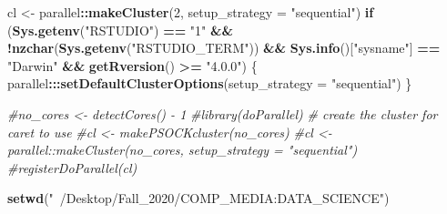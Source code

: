 \documentclass[
]{article}
\newenvironment{Shaded}{\begin{snugshade}}{\end{snugshade}}
\newcommand{\CommentTok}[1]{\textcolor[rgb]{0.56,0.35,0.01}{\textit{#1}}}
\newcommand{\ControlFlowTok}[1]{\textcolor[rgb]{0.13,0.29,0.53}{\textbf{#1}}}
\newcommand{\DataTypeTok}[1]{\textcolor[rgb]{0.13,0.29,0.53}{#1}}
\newcommand{\DecValTok}[1]{\textcolor[rgb]{0.00,0.00,0.81}{#1}}
\newcommand{\KeywordTok}[1]{\textcolor[rgb]{0.13,0.29,0.53}{\textbf{#1}}}
\newcommand{\NormalTok}[1]{#1}
\newcommand{\OperatorTok}[1]{\textcolor[rgb]{0.81,0.36,0.00}{\textbf{#1}}}
\newcommand{\StringTok}[1]{\textcolor[rgb]{0.31,0.60,0.02}{#1}}
\begin{document}
\begin{Shaded}
\begin{Highlighting}[]
\NormalTok{cl <-}\StringTok{ }\NormalTok{parallel}\OperatorTok{::}\KeywordTok{makeCluster}\NormalTok{(}\DecValTok{2}\NormalTok{, }\DataTypeTok{setup_strategy =} \StringTok{"sequential"}\NormalTok{)}
\ControlFlowTok{if}\NormalTok{ (}\KeywordTok{Sys.getenv}\NormalTok{(}\StringTok{"RSTUDIO"}\NormalTok{) }\OperatorTok{==}\StringTok{ "1"} \OperatorTok{&&}\StringTok{ }\OperatorTok{!}\KeywordTok{nzchar}\NormalTok{(}\KeywordTok{Sys.getenv}\NormalTok{(}\StringTok{"RSTUDIO_TERM"}\NormalTok{)) }\OperatorTok{&&}\StringTok{ }
\StringTok{    }\KeywordTok{Sys.info}\NormalTok{()[}\StringTok{"sysname"}\NormalTok{] }\OperatorTok{==}\StringTok{ "Darwin"} \OperatorTok{&&}\StringTok{ }\KeywordTok{getRversion}\NormalTok{() }\OperatorTok{>=}\StringTok{ "4.0.0"}\NormalTok{) \{}
\NormalTok{  parallel}\OperatorTok{:::}\KeywordTok{setDefaultClusterOptions}\NormalTok{(}\DataTypeTok{setup_strategy =} \StringTok{"sequential"}\NormalTok{)}
\NormalTok{\}}
\end{Highlighting}
\end{Shaded}

\begin{Shaded}
\begin{Highlighting}[]
\CommentTok{#no_cores <- detectCores() - 1}
\CommentTok{#library(doParallel)}
\CommentTok{# create the cluster for caret to use}
\CommentTok{#cl <- makePSOCKcluster(no_cores)}
\CommentTok{#cl <- parallel::makeCluster(no_cores, setup_strategy = "sequential")}
\CommentTok{#registerDoParallel(cl)}
\end{Highlighting}
\end{Shaded}

\begin{Shaded}
\begin{Highlighting}[]
\KeywordTok{setwd}\NormalTok{(}\StringTok{"~/Desktop/Fall_2020/COMP_MEDIA:DATA_SCIENCE"}\NormalTok{)}
\end{Highlighting}
\end{Shaded}

\begin{Shaded}
\end{Shaded}
\end{document}
